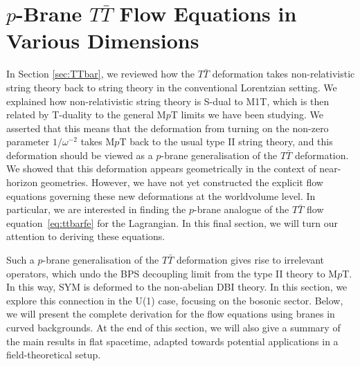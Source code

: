 \documentclass[11pt]{article}
\begin{document}
\section{\texorpdfstring{$p$}{p}-Brane \texorpdfstring{$T\bar{T}$}{TTbar} Flow Equations in Various Dimensions} \label{sec:pbttfe}

In Section \ref{sec:TTbar}, we reviewed how the $T \bar T$ deformation takes non-relativistic string theory back to string theory in the conventional Lorentzian setting.
We explained how non-relativistic string theory is S-dual to M1T, which is then related by T-duality to the general M$p$T limits we have been studying.
We asserted that this means that the deformation from turning on the non-zero parameter $1/\omega^{-2}$ takes M$p$T back to the usual type II string theory, and this deformation should be viewed as a $p$-brane generalisation of the $T \bar T$ deformation.
We showed that this deformation appears geometrically in the context of near-horizon geometries. 
However, we have not yet constructed the explicit flow equations governing these new deformations at the worldvolume level. In particular, we are interested in finding the $p$-brane analogue of the $T\bar{T}$ flow equation~\eqref{eq:ttbarfe} for the Lagrangian. 
In this final section, we will turn our attention to deriving these equations. 

Such a $p$-brane generalisation of the $T\bar{T}$ deformation gives rise to irrelevant operators, which undo the BPS decoupling limit from the type II theory to M$p$T. In this way, SYM is deformed to the non-abelian DBI theory.  In this section, we explore this connection in the U(1) case, focusing on the bosonic sector. Below, we will present the complete derivation for the flow equations using branes in curved backgrounds. 
At the end of this section, we will also give a summary of the main results in flat spacetime, adapted towards potential applications in a field-theoretical setup.
\end{document}
